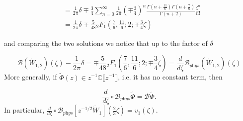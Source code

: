 \documentclass{article}
\newcommand{\C}{\mathbb{C}}
\newcommand{\borel}{\mathcal{B}}
\theoremstyle{definition}
\theoremstyle{plain}
\begin{document}
{\begin{align*}
&=\frac{1}{2\pi}\delta\mp\frac{3}{4}\sum_{n=0}^{\infty} \frac{1}{2\pi}\left(\mp\frac{3}{4}\right)^{n}\frac{\Gamma(n+\frac{11}{6})\Gamma(n+\frac{7}{6})}{\Gamma(n+2)}\frac{\zeta^{n}}{n!}\\
&=\frac{1}{2\pi}\delta\mp\frac{5}{48} {}_2F_1\left(\frac{7}{6},\frac{11}{6};2;\mp\frac{3}{4}\zeta\right)%
\end{align*}

and comparing the two solutions we notice that up to the factor of $\delta$

\begin{equation}\label{Borel-W12}
\borel(\tilde{W}_{1,2})(\zeta)-\frac{1}{2\pi}\delta=\mp \frac{5}{48} {}_2F_1\left(\frac{7}{6},\frac{11}{6};2;\mp\frac{3}{4}\zeta\right)=\frac{d}{d\zeta}\borel_{\textit{phys}}(\tilde{W}_{1,2})(\zeta) 
\end{equation}
More generally, if $\tilde{\Phi}(z)\in z^{-1}\C \llbracket z^{-1} \rrbracket$, i.e. it has no constant term, then 

\begin{equation}
\frac{d}{d\zeta}\circ\borel_{\textit{phys}}\tilde{\Phi}=\borel\tilde{\Phi}.
\end{equation}
In particular, $\frac{d}{d\zeta}\circ\borel_{\textit{phys}}\left[z^{-1/2}\tilde{W}_{1}\right]\left(\frac{2}{3}\zeta\right)=v_1(\zeta)$. 

}
\end{document}
